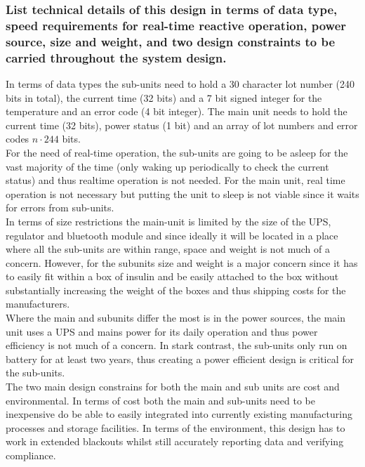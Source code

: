 \documentclass[12pt]{article} \usepackage{jeep} \usepackage{unicode}
\begin{document}
\subsubsection{List technical details of this design in terms of data type,
  speed requirements for real-time reactive operation, power source, size and
  weight, and two design constraints to be carried throughout the system
  design.}
In terms of data types the sub-units need to hold a 30 character lot number (240
bits in total), the current time (32 bits) and a 7 bit signed integer for the
temperature and an error code (4 bit integer). The main unit needs to hold the
current time (32 bits), power status (1 bit) and an array of lot numbers and
error codes $n\cdot244$ bits.\vspace{\baselineskip} \\
For the need of real-time operation, the sub-units are going to be asleep for the vast majority of the time (only waking up periodically to check the current status) and thus realtime operation is not needed. For the main unit, real time operation is not necessary but putting the unit to sleep is not viable since it waits for errors from sub-units.\vspace{\baselineskip}\\
In terms of size restrictions the main-unit is limited by the size of the UPS,
regulator and bluetooth module and since ideally it will be located in a place
where all the sub-units are within range, space and weight is not much of a
concern. However, for the subunits size and weight is a major concern since it
has to easily fit within a box of insulin and be easily attached to the box
without substantially increasing the weight of the boxes and thus shipping costs
for the manufacturers.\vspace{\baselineskip}\\
Where the main and subunits differ the most is in the power sources, the main unit uses a UPS and mains power for its daily operation and thus power efficiency is not much of a concern. In stark contrast, the sub-units only run on battery for at least two years, thus creating a power efficient design is critical for the sub-units.\\
The two main design constrains for both the main and sub units are cost and
environmental. In terms of cost both the main and sub-units need to be
inexpensive do be able to easily integrated into currently existing
manufacturing processes and storage facilities. In terms of the environment,
this design has to work in extended blackouts whilst still accurately reporting
data and verifying compliance.
\end{document}
